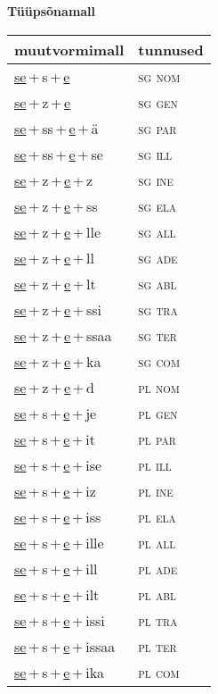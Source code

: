 
\vspace{1.8em}
\begin{minipage}{\textwidth}
\textbf{Tüüpsõnamall \,}\\

\begin{sideways}
\begin{tabular}{l l}
muutvormimall & tunnused \\
\hline
\underline{se}\,+\,s\,+\,\underline{e} & \textsc{ sg nom } \\
\underline{se}\,+\,z\,+\,\underline{e} & \textsc{ sg gen } \\
\underline{se}\,+\,ss\,+\,\underline{e}\,+\,ä & \textsc{ sg par } \\
\underline{se}\,+\,ss\,+\,\underline{e}\,+\,se & \textsc{ sg ill } \\
\underline{se}\,+\,z\,+\,\underline{e}\,+\,z & \textsc{ sg ine } \\
\underline{se}\,+\,z\,+\,\underline{e}\,+\,ss & \textsc{ sg ela } \\
\underline{se}\,+\,z\,+\,\underline{e}\,+\,lle & \textsc{ sg all } \\
\underline{se}\,+\,z\,+\,\underline{e}\,+\,ll & \textsc{ sg ade } \\
\underline{se}\,+\,z\,+\,\underline{e}\,+\,lt & \textsc{ sg abl } \\
\underline{se}\,+\,z\,+\,\underline{e}\,+\,ssi & \textsc{ sg tra } \\
\underline{se}\,+\,z\,+\,\underline{e}\,+\,ssaa & \textsc{ sg ter } \\
\underline{se}\,+\,z\,+\,\underline{e}\,+\,ka & \textsc{ sg com } \\
\underline{se}\,+\,z\,+\,\underline{e}\,+\,d & \textsc{ pl nom } \\
\underline{se}\,+\,s\,+\,\underline{e}\,+\,je & \textsc{ pl gen } \\
\underline{se}\,+\,s\,+\,\underline{e}\,+\,it & \textsc{ pl par } \\
\underline{se}\,+\,s\,+\,\underline{e}\,+\,ise & \textsc{ pl ill } \\
\underline{se}\,+\,s\,+\,\underline{e}\,+\,iz & \textsc{ pl ine } \\
\underline{se}\,+\,s\,+\,\underline{e}\,+\,iss & \textsc{ pl ela } \\
\underline{se}\,+\,s\,+\,\underline{e}\,+\,ille & \textsc{ pl all } \\
\underline{se}\,+\,s\,+\,\underline{e}\,+\,ill & \textsc{ pl ade } \\
\underline{se}\,+\,s\,+\,\underline{e}\,+\,ilt & \textsc{ pl abl } \\
\underline{se}\,+\,s\,+\,\underline{e}\,+\,issi & \textsc{ pl tra } \\
\underline{se}\,+\,s\,+\,\underline{e}\,+\,issaa & \textsc{ pl ter } \\
\underline{se}\,+\,s\,+\,\underline{e}\,+\,ika & \textsc{ pl com } \\
\end{tabular}
\end{sideways}
\label{tab:tüüpsõnamall-sese}


\end{minipage}
